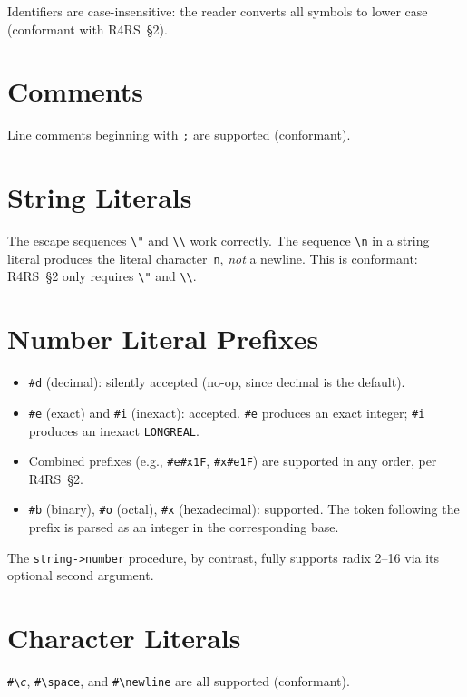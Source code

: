 \documentclass[12pt]{report}
\begin{document}
Identifiers are case-insensitive: the reader converts all symbols to
lower case (conformant with R4RS~\S2).

\section{Comments}

Line comments beginning with {\tt ;} are supported (conformant).

\section{String Literals}

The escape sequences {\tt \textbackslash"} and {\tt \textbackslash\textbackslash}
work correctly.  The sequence {\tt \textbackslash n} in a string literal produces
the literal character~{\tt n}, \emph{not} a newline.  This is conformant:
R4RS~\S2 only requires {\tt \textbackslash"} and {\tt \textbackslash\textbackslash}.

\section{Number Literal Prefixes}

\begin{itemize}
\item {\tt \#d} (decimal): silently accepted (no-op, since decimal is the default).
\item {\tt \#e} (exact) and {\tt \#i} (inexact): accepted.  {\tt \#e}
  produces an exact integer; {\tt \#i} produces an inexact {\tt LONGREAL}.
\item Combined prefixes (e.g., {\tt \#e\#x1F}, {\tt \#x\#e1F}) are
  supported in any order, per R4RS~\S2.
\item {\tt \#b} (binary), {\tt \#o} (octal), {\tt \#x} (hexadecimal):
  supported.  The token following the prefix is parsed as an integer in
  the corresponding base.
\end{itemize}

\noindent
The {\tt string->number} procedure, by contrast, fully supports radix
2--16 via its optional second argument.

\section{Character Literals}

{\tt \#\textbackslash\emph{c}}, {\tt \#\textbackslash space}, and
{\tt \#\textbackslash newline} are all supported (conformant).
\end{document}
